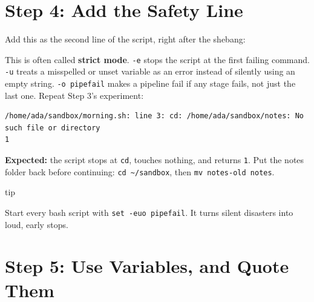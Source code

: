 
\section{Step 4: Add the Safety Line}\label{09-lab-automate-a-daily-chore:step-4-add-the-safety-line}

Add this as the second line of the script, right after the shebang:

\begin{codeblock}

\begin{Shaded}
\begin{Highlighting}[]
 
\end{Highlighting}
\end{Shaded}

\end{codeblock}

This is often called \textbf{strict mode}. \texttt{-e} stops the script at the first failing command. \texttt{-u} treats a misspelled or unset variable as an error instead of silently using an empty string. \texttt{-o\ pipefail} makes a pipeline fail if any stage fails, not just the last one. Repeat Step 3's experiment:

\begin{codeblock}
\begin{Verbatim}[formatcom=\outputstyle]
/home/ada/sandbox/morning.sh: line 3: cd: /home/ada/sandbox/notes: No such file or directory
1
\end{Verbatim}
\end{codeblock}

\textbf{Expected:} the script stops at \texttt{cd}, touches nothing, and returns \texttt{1}. Put the notes folder back before continuing: \texttt{cd\ \textasciitilde{}/sandbox}, then \texttt{mv\ notes-old\ notes}.

\begin{callout}{tip}

Start every bash script with \texttt{set\ -euo\ pipefail}. It turns silent disasters into loud, early stops.

\end{callout}


\section{Step 5: Use Variables, and Quote Them}\label{09-lab-automate-a-daily-chore:step-5-use-variables-and-quote-them}

